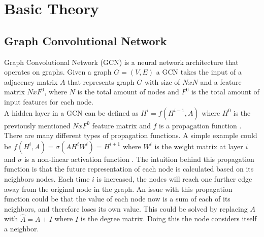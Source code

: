 \section{Basic Theory}

\subsection{Graph Convolutional Network}
Graph Convolutional Network (GCN) is a neural network architecture that operates on graphs.
Given a graph $G = (V,E)$ a GCN takes the input of a adjacency
matrix $A$ that represents graph $G$ with size of $N x N$ and a feature matrix $N x F^0$, where $N$ is the total amount of nodes and $F^0$ is the total amount of input features for each node.\\
\indent
A hidden layer in a GCN can be defined as $H^i = f(H^{i-1}, A)$ where $H^0$ is the previously mentioned $N x F^0$ feature matrix and $f$ is a propagation function \cite{Deep-Learning-on-Graphs-with-GCN}.
There are many different types of propagation functions.
A simple example could be $f(H^i, A) = \sigma(AH^iW^i) = H^{i+1}$ where $W^i$ is the weight matrix at layer $i$ and $\sigma$ is a non-linear activation function \cite{Deep-Learning-on-Graphs-with-GCN}.
The intuition behind this propagation function is that the future representation of each node is calculated based on its neighbors nodes.
Each time $i$ is increased, the nodes will reach one further edge away from the original node in the graph. %
An issue with this propagation function could be that the value of each node now is a sum of each of its neighbors, and therefore loses its own value.
This could be solved by replacing $A$ with $\hat{A} = A + I$ where $I$ is the degree matrix.
Doing this the node considers itself a neighbor.